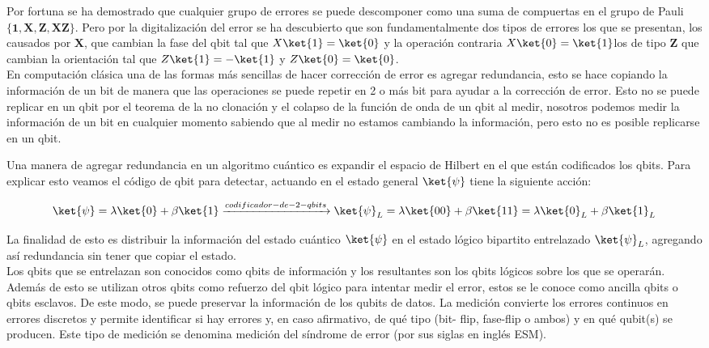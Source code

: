 Por fortuna se ha demostrado que cualquier grupo de errores se puede descomponer como una suma de compuertas en el grupo de Pauli $\{\mathbf{1},\mathbf{X},\mathbf{Z},\mathbf{XZ}\}$. Pero por la digitalización del error se ha descubierto que son fundamentalmente dos tipos de errores los que se presentan, los causados por $\mathbf{X}$, que cambian la fase del qbit tal que $X\ket{1}=\ket{0}$ y la operación contraria $X\ket{0}=\ket{1}$los de tipo $\mathbf{Z}$ que cambian la orientación tal que $Z\ket{1}=-\ket{1}$ y $Z\ket{0}=\ket{0}$.\\

En computación clásica una de las formas más sencillas de hacer corrección de error es agregar redundancia, esto se hace copiando la información de un bit de manera que las operaciones se puede repetir en 2 o más bit para ayudar a la corrección de error. Esto no se puede replicar en un qbit por el teorema de la no clonación y el colapso de la función de onda de un qbit al medir, nosotros podemos medir la información de un bit en cualquier momento sabiendo que al medir no estamos cambiando la información, pero esto no es posible replicarse en un qbit.

Una manera de agregar redundancia en un algoritmo cuántico es expandir el espacio de Hilbert en el que están codificados los qbits. Para explicar esto veamos el código de qbit para detectar, actuando en el estado general $\ket{\psi}$ tiene la siguiente acción:

\begin{equation}
    \ket{\psi}=\lambda\ket{0}+\beta\ket{1}\xrightarrow{codificador-de-2-qbits}\ket{\psi}_{L}=\lambda\ket{00}+\beta\ket{11}=\lambda\ket{0}_{L}+\beta\ket{1}_{L}
\end{equation}

La finalidad de esto es distribuir la información del estado cuántico $\ket{\psi}$ en el estado lógico bipartito entrelazado $\ket{\psi}_{L}$, agregando así redundancia sin tener que copiar el estado.\\

Los qbits que se entrelazan son conocidos como qbits de información y los resultantes son los qbits lógicos sobre los que se operarán. Además de esto se utilizan otros qbits como refuerzo del qbit lógico para intentar medir el error, estos se le conoce como ancilla qbits o qbits esclavos. De este modo, se puede preservar la información de los qubits de datos. La medición convierte los errores continuos en errores discretos y permite identificar si hay errores y, en caso afirmativo, de qué tipo (bit- ﬂip, fase-ﬂip o ambos) y en qué qubit(s) se producen. Este tipo de medición se denomina medición del síndrome de error (por sus siglas en inglés ESM). \\


